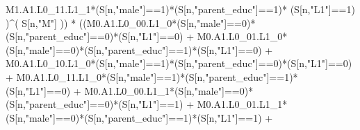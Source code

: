 \documentclass[
]{book}
\newenvironment{Shaded}{\begin{snugshade}}{\end{snugshade}}
\newcommand{\DecValTok}[1]{\textcolor[rgb]{0.00,0.00,0.81}{#1}}
\newcommand{\NormalTok}[1]{#1}
\newcommand{\SpecialCharTok}[1]{\textcolor[rgb]{0.00,0.00,0.00}{#1}}
\newcommand{\StringTok}[1]{\textcolor[rgb]{0.31,0.60,0.02}{#1}}
\begin{document}
\begin{Shaded}
\begin{Highlighting}[]
\NormalTok{          M1.A1.L0\_11.L1\_1}\SpecialCharTok{*}\NormalTok{(S[n,}\StringTok{"male"}\NormalTok{]}\SpecialCharTok{==}\DecValTok{1}\NormalTok{)}\SpecialCharTok{*}\NormalTok{(S[n,}\StringTok{"parent\_educ"}\NormalTok{]}\SpecialCharTok{==}\DecValTok{1}\NormalTok{)}\SpecialCharTok{*}
\NormalTok{          (S[n,}\StringTok{"L1"}\NormalTok{]}\SpecialCharTok{==}\DecValTok{1}\NormalTok{) )}\SpecialCharTok{\^{}}\NormalTok{( S[n,}\StringTok{"M"}\NormalTok{] )) }\SpecialCharTok{*}
\NormalTok{      ((M0.A1.L0\_00.L1\_0}\SpecialCharTok{*}\NormalTok{(S[n,}\StringTok{"male"}\NormalTok{]}\SpecialCharTok{==}\DecValTok{0}\NormalTok{)}\SpecialCharTok{*}\NormalTok{(S[n,}\StringTok{"parent\_educ"}\NormalTok{]}\SpecialCharTok{==}\DecValTok{0}\NormalTok{)}\SpecialCharTok{*}\NormalTok{(S[n,}\StringTok{"L1"}\NormalTok{]}\SpecialCharTok{==}\DecValTok{0}\NormalTok{) }\SpecialCharTok{+}                
\NormalTok{          M0.A1.L0\_01.L1\_0}\SpecialCharTok{*}\NormalTok{(S[n,}\StringTok{"male"}\NormalTok{]}\SpecialCharTok{==}\DecValTok{0}\NormalTok{)}\SpecialCharTok{*}\NormalTok{(S[n,}\StringTok{"parent\_educ"}\NormalTok{]}\SpecialCharTok{==}\DecValTok{1}\NormalTok{)}\SpecialCharTok{*}\NormalTok{(S[n,}\StringTok{"L1"}\NormalTok{]}\SpecialCharTok{==}\DecValTok{0}\NormalTok{) }\SpecialCharTok{+}
\NormalTok{          M0.A1.L0\_10.L1\_0}\SpecialCharTok{*}\NormalTok{(S[n,}\StringTok{"male"}\NormalTok{]}\SpecialCharTok{==}\DecValTok{1}\NormalTok{)}\SpecialCharTok{*}\NormalTok{(S[n,}\StringTok{"parent\_educ"}\NormalTok{]}\SpecialCharTok{==}\DecValTok{0}\NormalTok{)}\SpecialCharTok{*}\NormalTok{(S[n,}\StringTok{"L1"}\NormalTok{]}\SpecialCharTok{==}\DecValTok{0}\NormalTok{) }\SpecialCharTok{+} 
\NormalTok{          M0.A1.L0\_11.L1\_0}\SpecialCharTok{*}\NormalTok{(S[n,}\StringTok{"male"}\NormalTok{]}\SpecialCharTok{==}\DecValTok{1}\NormalTok{)}\SpecialCharTok{*}\NormalTok{(S[n,}\StringTok{"parent\_educ"}\NormalTok{]}\SpecialCharTok{==}\DecValTok{1}\NormalTok{)}\SpecialCharTok{*}\NormalTok{(S[n,}\StringTok{"L1"}\NormalTok{]}\SpecialCharTok{==}\DecValTok{0}\NormalTok{) }\SpecialCharTok{+}
\NormalTok{          M0.A1.L0\_00.L1\_1}\SpecialCharTok{*}\NormalTok{(S[n,}\StringTok{"male"}\NormalTok{]}\SpecialCharTok{==}\DecValTok{0}\NormalTok{)}\SpecialCharTok{*}\NormalTok{(S[n,}\StringTok{"parent\_educ"}\NormalTok{]}\SpecialCharTok{==}\DecValTok{0}\NormalTok{)}\SpecialCharTok{*}\NormalTok{(S[n,}\StringTok{"L1"}\NormalTok{]}\SpecialCharTok{==}\DecValTok{1}\NormalTok{) }\SpecialCharTok{+}
\NormalTok{          M0.A1.L0\_01.L1\_1}\SpecialCharTok{*}\NormalTok{(S[n,}\StringTok{"male"}\NormalTok{]}\SpecialCharTok{==}\DecValTok{0}\NormalTok{)}\SpecialCharTok{*}\NormalTok{(S[n,}\StringTok{"parent\_educ"}\NormalTok{]}\SpecialCharTok{==}\DecValTok{1}\NormalTok{)}\SpecialCharTok{*}\NormalTok{(S[n,}\StringTok{"L1"}\NormalTok{]}\SpecialCharTok{==}\DecValTok{1}\NormalTok{) }\SpecialCharTok{+}

\end{Highlighting}
\end{Shaded}
\end{document}
